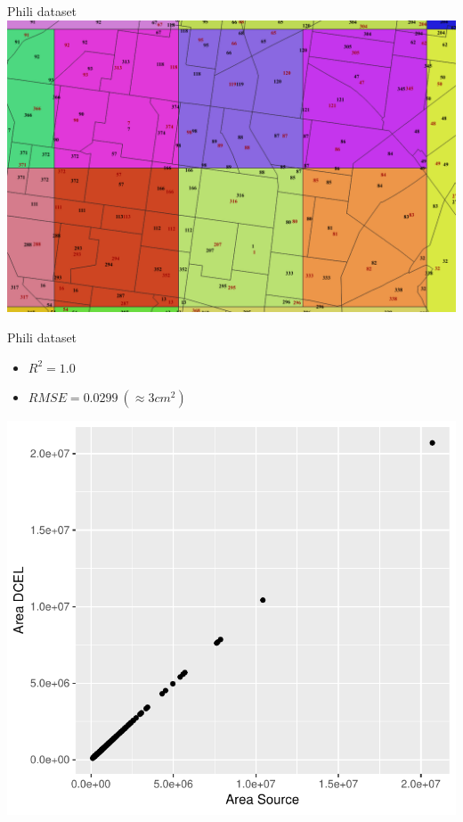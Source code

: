 \documentclass{beamer}
\begin{document}
\begin{frame}{Phili dataset}
    \centering 
    \includegraphics[width=0.9\linewidth]{figures/PhiliTest2.png} 
\end{frame}

\begin{frame}{Phili dataset}
    \begin{itemize}
        \item $R^2 = 1.0$
        \item $RMSE = 0.0299\ (\approx3cm^2)$
    \end{itemize}
    \centering 
    \includegraphics[width=0.55\linewidth]{figures/PhiliDiff} 
\end{frame}
\end{document}
